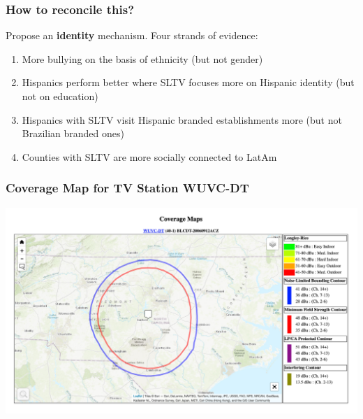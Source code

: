 \documentclass{beamer}
\begin{document}
\begin{frame}
\frametitle{How to reconcile this?}


\pause 
Propose an \textbf{identity} mechanism. Four strands of evidence:
\vspace{1.5em}
\begin{enumerate}
  \setlength\itemsep{1.5em}
\item More bullying on the basis of ethnicity (but not gender)

\item Hispanics perform better where SLTV focuses more on Hispanic identity (but not on education)

\item Hispanics with SLTV visit Hispanic branded establishments more (but not Brazilian branded ones)

\item Counties with SLTV are more socially connected to LatAm
\end{enumerate}

\end{frame}



\begin{frame}
\frametitle{Coverage Map for TV Station WUVC-DT}
\centering
        \includegraphics[width=1\textwidth]{../../analysis/Output/img/ContourExample.png}\\
\end{frame}
\end{document}

